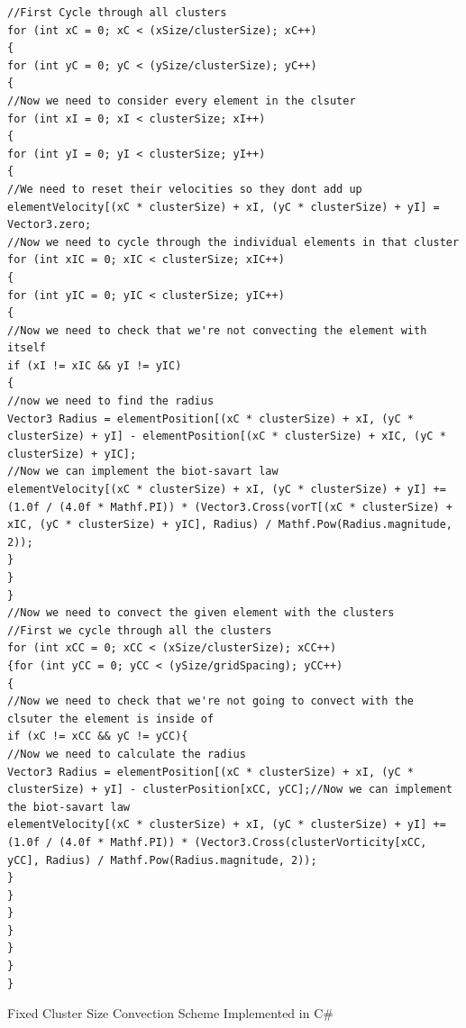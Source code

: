 \begin{listing}[H]
\begin{verbatim}
//First Cycle through all clusters
for (int xC = 0; xC < (xSize/clusterSize); xC++)
{
for (int yC = 0; yC < (ySize/clusterSize); yC++)
{
//Now we need to consider every element in the clsuter
for (int xI = 0; xI < clusterSize; xI++)
{
for (int yI = 0; yI < clusterSize; yI++)
{
//We need to reset their velocities so they dont add up
elementVelocity[(xC * clusterSize) + xI, (yC * clusterSize) + yI] = Vector3.zero;
//Now we need to cycle through the individual elements in that cluster
for (int xIC = 0; xIC < clusterSize; xIC++)
{
for (int yIC = 0; yIC < clusterSize; yIC++)
{                     
//Now we need to check that we're not convecting the element with itself
if (xI != xIC && yI != yIC)
{
//now we need to find the radius
Vector3 Radius = elementPosition[(xC * clusterSize) + xI, (yC * clusterSize) + yI] - elementPosition[(xC * clusterSize) + xIC, (yC * clusterSize) + yIC];
//Now we can implement the biot-savart law
elementVelocity[(xC * clusterSize) + xI, (yC * clusterSize) + yI] += (1.0f / (4.0f * Mathf.PI)) * (Vector3.Cross(vorT[(xC * clusterSize) + xIC, (yC * clusterSize) + yIC], Radius) / Mathf.Pow(Radius.magnitude, 2));
}
}
}
//Now we need to convect the given element with the clusters
//First we cycle through all the clusters
for (int xCC = 0; xCC < (xSize/clusterSize); xCC++)
{for (int yCC = 0; yCC < (ySize/gridSpacing); yCC++)
{
//Now we need to check that we're not going to convect with the clsuter the element is inside of
if (xC != xCC && yC != yCC){
//Now we need to calculate the radius
Vector3 Radius = elementPosition[(xC * clusterSize) + xI, (yC * clusterSize) + yI] - clusterPosition[xCC, yCC];//Now we can implement the biot-savart law
elementVelocity[(xC * clusterSize) + xI, (yC * clusterSize) + yI] += (1.0f / (4.0f * Mathf.PI)) * (Vector3.Cross(clusterVorticity[xCC, yCC], Radius) / Mathf.Pow(Radius.magnitude, 2));                             
}
}
}
}
}
}
}
\end{verbatim}
\caption{Fixed Cluster Size Convection Scheme Implemented in C\#}
\label{list:FixedCluster}
\end{listing}

